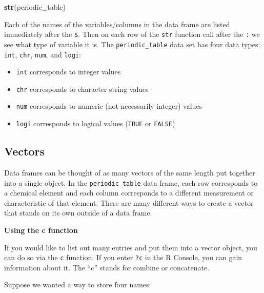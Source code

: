 \documentclass[]{tufte-book}
\newenvironment{Shaded}{\begin{snugshade}}{\end{snugshade}}
\newcommand{\KeywordTok}[1]{\textcolor[rgb]{0.13,0.29,0.53}{\textbf{#1}}}
\newcommand{\NormalTok}[1]{#1}
\providecommand{\tightlist}{%
  \setlength{\itemsep}{0pt}\setlength{\parskip}{0pt}}
\begin{document}
\begin{Shaded}
\begin{Highlighting}[]
\KeywordTok{str}\NormalTok{(periodic\_table)}
\end{Highlighting}
\end{Shaded}

Each of the names of the variables/columns in the data frame are listed immediately after the \texttt{\$}. Then on each row of the \texttt{str} function call after the \texttt{:} we see what type of variable it is. The \texttt{periodic\_table} data set has four data types: \texttt{int}, \texttt{chr}, \texttt{num}, and \texttt{logi}:

\begin{itemize}
\tightlist
\item
  \texttt{int} corresponds to integer values
\item
  \texttt{chr} corresponds to character string values
\item
  \texttt{num} corresponds to numeric (not necessarily integer) values
\item
  \texttt{logi} corresponds to logical values (\texttt{TRUE} or \texttt{FALSE})
\end{itemize}

\hypertarget{vectors}{%
\subsection{Vectors}\label{vectors}}

Data frames can be thought of as many vectors of the same length put together into a single object. In the \texttt{periodic\_table} data frame, each row corresponds to a chemical element and each column corresponds to a different measurement or characteristic of that element. There are many different ways to create a vector that stands on its own outside of a data frame. \newline\vspace*{0.1in}

\vspace*{0.2in}

\noindent\textbf{Using the c function}\vspace*{0.1in}

If you would like to list out many entries and put them into a vector object, you can do so via the \texttt{c} function. If you enter \texttt{?c} in the R Console, you can gain information about it. The ``c'' stands for combine or concatenate.

Suppose we wanted a way to store four names:
\end{document}
